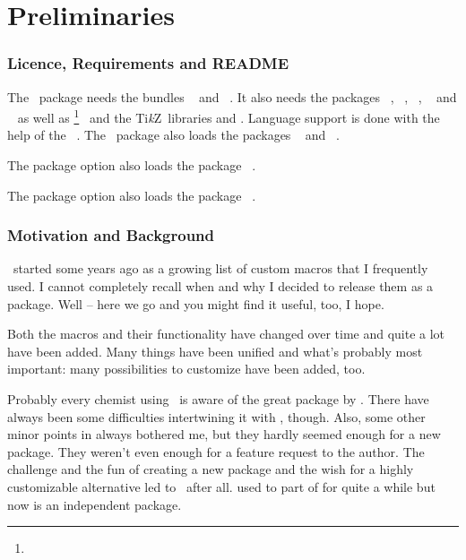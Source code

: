 \documentclass[load-preamble+]{cnltx-doc}
\newcommand*\TikZ{Ti\textit{k}Z}
\begin{document}
\part{Preliminaries}
\section{Licence, Requirements and \textsc{README}}
\license

The \chemmacros\ package needs the bundles ~\cite{bnd:l3kernel}
and ~\cite{bnd:l3packages}.  It also needs the packages
~\cite{pkg:siunitx},
~\cite{pkg:mathtools}, ~\cite{pkg:bm},
~\cite{pkg:nicefrac} and
~\cite{pkg:environ} as well as
\footnote{}~\cite{pkg:pgf} and the \TikZ\
libraries  and .  Language support is done with the
help of the \needpackage{translations}~\cite{pkg:translations}.  The
\chemmacros\ package also loads the packages
~\cite{pkg:chemformula} and
~\cite{pkg:chemgreek}.

The package option  also loads the package
~\cite{pkg:xspace}.

The package option  also loads the package
~\cite{pkg:ghsystem}.


\section{Motivation and Background}
\chemmacros\ started some years ago as a growing list of custom macros that I
frequently used.  I cannot completely recall when and why I decided to release
them as a package.  Well -- here we go and you might find it useful, too, I
hope.

Both the macros and their functionality have changed over time and quite a lot
have been added.  Many things have been unified and what's probably most
important: many possibilities to customize have been added, too.

Probably every chemist using \LaTeXe\ is aware of the great 
package by \hensel.  There have always been some difficulties intertwining it
with \chemmacros, though.  Also, some other minor points in 
always bothered me, but they hardly seemed enough for a new package.  They
weren't even enough for a feature request to the \pkg{mhchem} author.  The
challenge and the fun of creating a new package and the wish for a highly
customizable alternative led to \chemformula\ after all.  \chemformula{} used
to part of \chemmacros{} for quite a while but now is an independent package.
\end{document}
